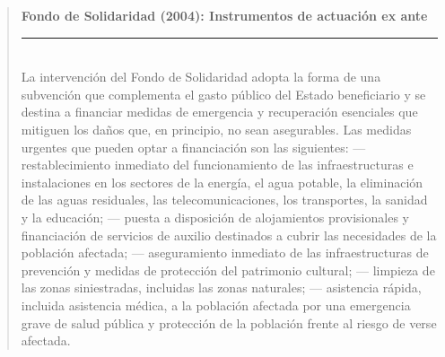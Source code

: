 \documentclass[10pt,a4paper]{article}
\newenvironment{specialblock}[1]{%
      \begin{quote} %
      \small %
      \noindent\textbf{#1}\\[-0.3em] %
      \rule{\linewidth}{0.4pt}\\[0.6em]}{
      \end{quote}}
\begin{document}
\begin{specialblock}{Fondo de Solidaridad (2004): Instrumentos de actuación ex ante}
    La intervención del Fondo de Solidaridad adopta la forma de una subvención que complementa el gasto público del Estado beneficiario y se destina a financiar medidas de emergencia y recuperación esenciales que mitiguen los daños que, en principio, no sean asegurables. Las medidas urgentes que pueden optar a financiación son las siguientes: — restablecimiento inmediato del funcionamiento de las infraestructuras e instalaciones en los sectores de la energía, el agua potable, la eliminación de las aguas residuales, las telecomunicaciones, los transportes, la sanidad y la educación; — puesta a disposición de alojamientos provisionales y financiación de servicios de auxilio destinados a cubrir las necesidades de la población afectada; — aseguramiento inmediato de las infraestructuras de prevención y medidas de protección del patrimonio cultural; — limpieza de las zonas siniestradas, incluidas las zonas naturales; — asistencia rápida, incluida asistencia médica, a la población afectada por una emergencia grave de salud pública y protección de la población frente al riesgo de verse afectada.
\end{specialblock}
\end{document}
